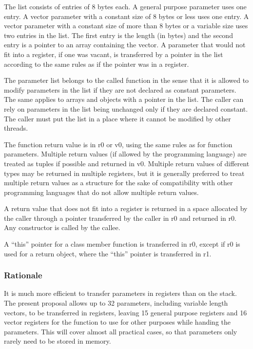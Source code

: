 \documentclass[forwardcom.tex]{subfiles}
\begin{document}
The list consists of entries of 8 bytes each. A general purpose parameter uses one entry. A vector parameter with a constant size of 8 bytes or less uses one entry. A vector parameter with a constant size of more than 8 bytes or a variable size uses two entries in the list. The first entry is the length (in bytes) and the second entry is a pointer to an array containing the vector. A parameter that would not fit into a register, if one was vacant, is transferred by a pointer in the list according to the same rules as if the pointer was in a register. 
\vspace{2mm}

The parameter list belongs to the called function in the sense that it is allowed to modify parameters in the list if they are not declared as constant parameters. The same applies to arrays and objects with a pointer in the list. The caller can rely on parameters in the list being unchanged only if they are declared constant. The caller must put the list in a place where it cannot be modified by other threads. 
\vspace{2mm}

The function return value is in r0 or v0, using the same rules as for function parameters. Multiple return values (if allowed by the programming language) are treated as tuples if possible and returned in v0. Multiple return values of different types may be returned in multiple registers, but it is generally preferred to treat multiple return values as a structure for the sake of compatibility with other programming languages that do not allow multiple return values. 
\vspace{2mm}

A return value that does not fit into a register is returned in a space allocated by the caller through a pointer transferred by the caller in r0 and returned in r0. Any constructor is called by the callee. 
\vspace{2mm}

A ``this'' pointer for a class member function is transferred in r0, except if r0 is used for a return object, where the ``this'' pointer is transferred in r1. 

\subsubsection{Rationale}
It is much more efficient to transfer parameters in registers than on the stack. The present proposal allows up to 32 parameters, including variable length vectors, to be transferred in registers, leaving 15 general purpose registers and 16 vector registers for the function to use for other purposes while handing the parameters. This will cover almost all practical cases, so that parameters only rarely need to be stored in memory. 
\vspace{2mm}
\end{document}
